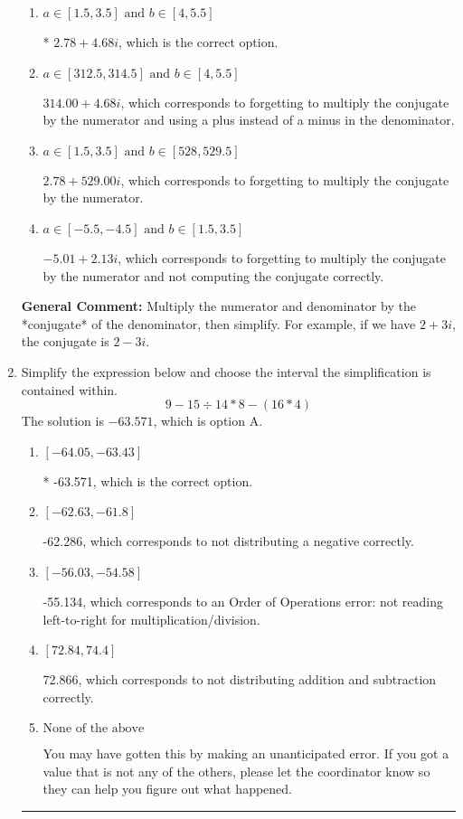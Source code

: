 \documentclass{extbook}[14pt]
\newcommand{\litem}[1]{\item #1

\rule{\textwidth}{0.4pt}}
\begin{document}
\begin{enumerate}
{\begin{enumerate}[label=\Alph*.]
 $-2.57  + 6.88 i$, which corresponds to just dividing the first term by the first term and the second by the second.
\item \( a \in [1.5, 3.5] \text{ and } b \in [4, 5.5] \)

* $2.78  + 4.68 i$, which is the correct option.
\item \( a \in [312.5, 314.5] \text{ and } b \in [4, 5.5] \)

 $314.00  + 4.68 i$, which corresponds to forgetting to multiply the conjugate by the numerator and using a plus instead of a minus in the denominator.
\item \( a \in [1.5, 3.5] \text{ and } b \in [528, 529.5] \)

 $2.78  + 529.00 i$, which corresponds to forgetting to multiply the conjugate by the numerator.
\item \( a \in [-5.5, -4.5] \text{ and } b \in [1.5, 3.5] \)

 $-5.01  + 2.13 i$, which corresponds to forgetting to multiply the conjugate by the numerator and not computing the conjugate correctly.
\end{enumerate}

\textbf{General Comment:} Multiply the numerator and denominator by the *conjugate* of the denominator, then simplify. For example, if we have $2+3i$, the conjugate is $2-3i$.
}
\litem{
Simplify the expression below and choose the interval the simplification is contained within.
\[ 9 - 15 \div 14 * 8 - (16 * 4) \]
The solution is \( -63.571 \), which is option A.\begin{enumerate}[label=\Alph*.]
\item \( [-64.05, -63.43] \)

* -63.571, which is the correct option.
\item \( [-62.63, -61.8] \)

 -62.286, which corresponds to not distributing a negative correctly.
\item \( [-56.03, -54.58] \)

 -55.134, which corresponds to an Order of Operations error: not reading left-to-right for multiplication/division.
\item \( [72.84, 74.4] \)

 72.866, which corresponds to not distributing addition and subtraction correctly.
\item \( \text{None of the above} \)

 You may have gotten this by making an unanticipated error. If you got a value that is not any of the others, please let the coordinator know so they can help you figure out what happened.
\end{enumerate}

}
\end{enumerate}
\end{document}
